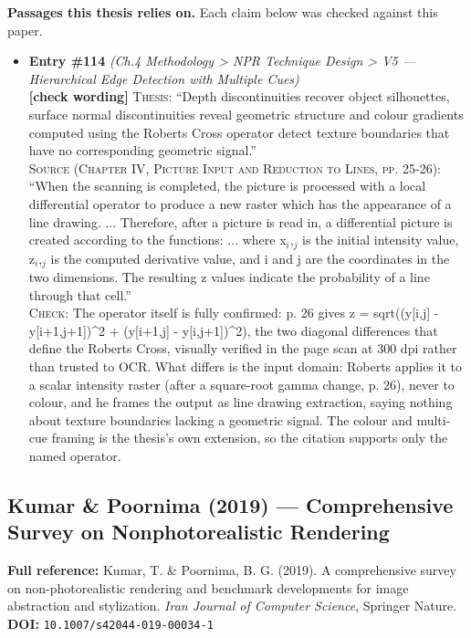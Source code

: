 \documentclass[11pt, a4paper]{article}
\begin{document}
\textbf{Passages this thesis relies on.} Each claim below was checked against this paper.
\begin{itemize}[leftmargin=1.2em,itemsep=4pt]
\item \textbf{Entry \#114} \textit{(Ch.4 Methodology > NPR Technique Design > V5 — Hierarchical Edge Detection with Multiple Cues)}\\
\textcolor{partialorange}{\textbf{[check wording]}} \textsc{Thesis:} ``Depth discontinuities recover object silhouettes, surface normal discontinuities reveal geometric structure and colour gradients computed using the Roberts Cross operator detect texture boundaries that have no corresponding geometric signal.''\\
\textsc{Source (Chapter IV, Picture Input and Reduction to Lines, pp. 25-26):} ``When the scanning is completed, the picture is processed with a local differential operator to produce a new raster which has the appearance of a line drawing. ... Therefore, after a picture is read in, a differential picture is created according to the functions: ... where x$_{i}$,$_{j}$ is the initial intensity value, z$_{i}$,$_{j}$ is the computed derivative value, and i and j are the coordinates in the two dimensions. The resulting z values indicate the probability of a line through that cell.''\\
\textsc{Check:} The operator itself is fully confirmed: p. 26 gives z = sqrt((y[i,j] - y[i+1,j+1])\textasciicircum{}2 + (y[i+1,j] - y[i,j+1])\textasciicircum{}2), the two diagonal differences that define the Roberts Cross, visually verified in the page scan at 300 dpi rather than trusted to OCR. What differs is the input domain: Roberts applies it to a scalar intensity raster (after a square-root gamma change, p. 26), never to colour, and he frames the output as line drawing extraction, saying nothing about texture boundaries lacking a geometric signal. The colour and multi-cue framing is the thesis's own extension, so the citation supports only the named operator.
\end{itemize}

\vspace{8pt}
\subsection{Kumar \& Poornima (2019) --- Comprehensive Survey on Nonphotorealistic Rendering}

\begin{refbox}
\textbf{Full reference:} Kumar, T. \& Poornima, B. G. (2019). A comprehensive survey on non-photorealistic rendering and benchmark developments for image abstraction and stylization. \textit{Iran Journal of Computer Science}, Springer Nature.\\[4pt]
\textbf{DOI:} \texttt{10.1007/s42044-019-00034-1}
\end{refbox}
\end{document}
